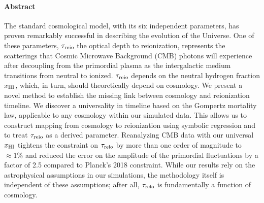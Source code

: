 

\paragraph{\large Abstract}

The standard cosmological model, with its six independent parameters,
has proven remarkably successful in describing the evolution of the
Universe.
One of these parameters, $\tau_{\mathrm{reio}}$ the optical depth to reionization,
represents the scatterings that Cosmic Microwave Background (CMB)
photons will experience after decoupling from the primordial plasma as
the intergalactic medium transitions from neutral to ionized.
$\tau_{\mathrm{reio}}$ depends on the neutral hydrogen fraction $x_{\mathrm{HI}}$, which, in
turn, should theoretically depend on cosmology.
We present a novel method to establish the missing link between
cosmology and reionization timeline.
We discover a universality in timeline based on the Gompertz mortality
law, applicable to any cosmology within our simulated data.
This allows us to construct mapping from cosmology to reionization using
symbolic regression and to treat $\tau_{\mathrm{reio}}$ as a derived parameter.
Reanalyzing CMB data with our universal $x_{\mathrm{HI}}$ tightens the constraint
on $\tau_{\mathrm{reio}}$ by more than one order of magnitude to $\approx 1\%$ and
reduced the error on the amplitude of the primordial fluctuations by a
factor of 2.5 compared to Planck's 2018 constraint.
While our results rely on the astrophysical assumptions in our
simulations, the methodology itself is independent of these assumptions;
after all, $\tau_{\mathrm{reio}}$ is fundamentally a function of cosmology.
